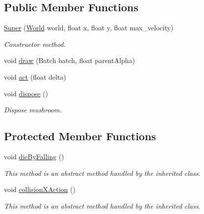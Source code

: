\subsection*{Public Member Functions}
\begin{DoxyCompactItemize}
\item 
\hyperlink{classnl_1_1arjanfrans_1_1mario_1_1model_1_1Super_ae31b2b33e224cd5db2e05aabc2e199d8}{Super} (\hyperlink{classnl_1_1arjanfrans_1_1mario_1_1model_1_1World}{World} world, float x, float y, float max\+\_\+velocity)
\begin{DoxyCompactList}\small\item\em Constructor method. \end{DoxyCompactList}\item 
void \hyperlink{classnl_1_1arjanfrans_1_1mario_1_1model_1_1Super_a07b8616c015473a84a5fc9a4108c9995}{draw} (Batch batch, float parent\+Alpha)
\item 
void \hyperlink{classnl_1_1arjanfrans_1_1mario_1_1model_1_1Super_a223190b10a7e63d5057f71cba6e60675}{act} (float delta)
\item 
void \hyperlink{classnl_1_1arjanfrans_1_1mario_1_1model_1_1Super_a10d5cd8618339a32260cdd5bed6ad4dd}{dispose} ()
\begin{DoxyCompactList}\small\item\em Dispose mushroom. \end{DoxyCompactList}\end{DoxyCompactItemize}
\subsection*{Protected Member Functions}
\begin{DoxyCompactItemize}
\item 
void \hyperlink{classnl_1_1arjanfrans_1_1mario_1_1model_1_1Super_a42fb98695c2b31d9078cbe864167ad9d}{die\+By\+Falling} ()
\begin{DoxyCompactList}\small\item\em This method is an abstract method handled by the inherited class. \end{DoxyCompactList}\item 
void \hyperlink{classnl_1_1arjanfrans_1_1mario_1_1model_1_1Super_a71c70031aa0752fb4b2917aa4911f68d}{collision\+X\+Action} ()
\begin{DoxyCompactList}\small\item\em This method is an abstract method handled by the inherited class. \end{DoxyCompactList}\end{DoxyCompactItemize}
